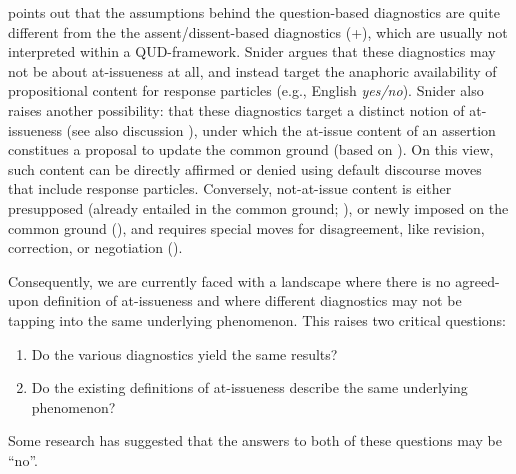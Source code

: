 \documentclass[times,linguex,xcolor]{glossa}
\begin{document}
    \citet{snider_at-issuenessne_2017,snider_anaphoric_2017} points out that the assumptions behind the question-based diagnostics are quite different from the the assent/dissent-based diagnostics (+), which are usually not interpreted within a QUD-framework. Snider argues that these diagnostics may not be about at-issueness at all, and instead target the anaphoric availability of propositional content for response particles (e.g., English \emph{yes/no}).
    Snider also raises another possibility: that these diagnostics target a distinct notion of at-issueness (see also discussion \citealt{koev_notions_2018,faller_discourse_2019,korotkova_evidential_2020}), under which the at-issue content of an assertion constitues a proposal to update the common ground (based on \citealt{farkas_reacting_2010}). On this view, such content can be directly affirmed or denied using default discourse moves that include response particles. Conversely, not-at-issue content is either presupposed (already entailed in the common ground; \citealt{stalnaker_presuppositions_1973,stalnaker_common_2002}), or newly imposed on the common ground (\citealt{murray_varieties_2014,anderbois_at-issue_2015}), and requires special moves for disagreement, like revision, correction, or negotiation (\citealt{potts_logic_2005}).

  Consequently, we are currently faced with a landscape where there is no agreed-upon definition of at-issueness and where different diagnostics may not be tapping into the same underlying phenomenon. This raises two critical questions:

  \begin{enumerate}
    \item Do the various diagnostics yield the same results?
    \item Do the existing definitions of at-issueness describe the same underlying phenomenon?
  \end{enumerate}

  \noindent Some research has suggested that the answers to both of these questions may be ``no''.

\end{document}
